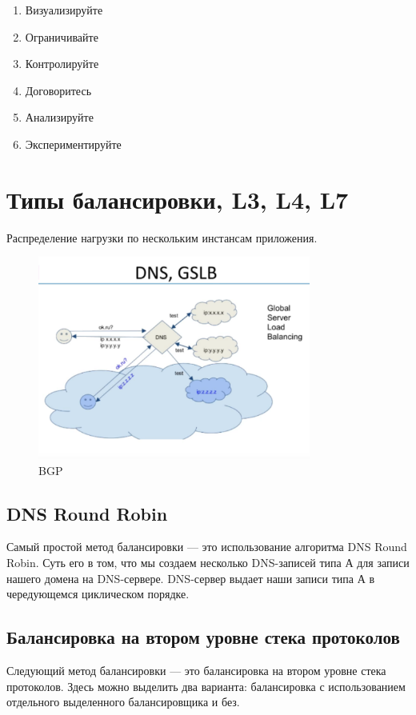 \begin{enumerate}
\item Визуализируйте
\item Ограничивайте
\item Контролируйте
\item Договоритесь
\item Анализируйте
\item Экспериментируйте
\end{enumerate}


 \section{Типы балансировки, L3, L4, L7}
Распределение нагрузки по нескольким инстансам приложения.

\begin{figure}[h!]
\centering
\includegraphics[width=0.8\textwidth]{img/balansing.png}
\caption{BGP}
\label{balansing}
\end{figure}
 
 \subsection{DNS Round Robin}
 Самый простой метод балансировки — это использование алгоритма DNS Round Robin. Суть его в том, что мы создаем несколько DNS-записей типа А для записи нашего домена на DNS-сервере. DNS-сервер выдает наши записи типа А в чередующемся циклическом порядке.
 
\subsection{Балансировка на втором уровне стека протоколов}     
 Следующий метод балансировки — это балансировка на втором уровне стека протоколов. Здесь можно выделить два варианта: балансировка с использованием отдельного выделенного балансировщика и без.

